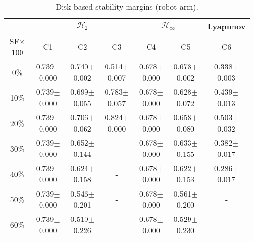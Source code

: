 \begin{table}[H]
\centering
\scriptsize
\begin{tabular}{| c || c | c | c | c | c | c |}
	\hline
	 & \multicolumn{3}{c|}{$\mathcal{H}_{2}$} & \multicolumn{2}{c|}{$\mathcal{H}_{\infty}$} & Lyapunov\\
	\hline
	SF$\times$100 & C1& C2 & C3 & C4 & C5 & C6\\
	\hline\hline
	0\% & 0.739$\pm$0.000 & 0.740$\pm$0.002 & 0.514$\pm$0.007 & 0.678$\pm$0.000 & 0.678$\pm$0.002 & 0.338$\pm$0.003\\
	\hline
	10\% & 0.739$\pm$0.000 & 0.699$\pm$0.055 & 0.783$\pm$0.057 & 0.678$\pm$0.000 & 0.628$\pm$0.072 & 0.439$\pm$0.013\\
	\hline
	20\% & 0.739$\pm$0.000 & 0.706$\pm$0.062 & 0.824$\pm$0.000 & 0.678$\pm$0.000 & 0.658$\pm$0.080 & 0.503$\pm$0.032\\
	\hline
	30\% & 0.739$\pm$0.000 & 0.652$\pm$0.144 & - & 0.678$\pm$0.000 & 0.633$\pm$0.155 & 0.382$\pm$0.017\\
	\hline
	40\% & 0.739$\pm$0.000 & 0.624$\pm$0.158 & - & 0.678$\pm$0.000 & 0.622$\pm$0.153 & 0.286$\pm$0.017\\
	\hline
	50\% & 0.739$\pm$0.000 & 0.546$\pm$0.201 & - & 0.678$\pm$0.000 & 0.561$\pm$0.200 & -\\
	\hline
	60\% & 0.739$\pm$0.000 & 0.519$\pm$0.226 & - & 0.678$\pm$0.000 & 0.529$\pm$0.230 & -\\
	\hline
\end{tabular}
\caption{Disk-based stability margins (robot arm).}
\label{table:disk_margins_robot_arm:noise}
\end{table}

